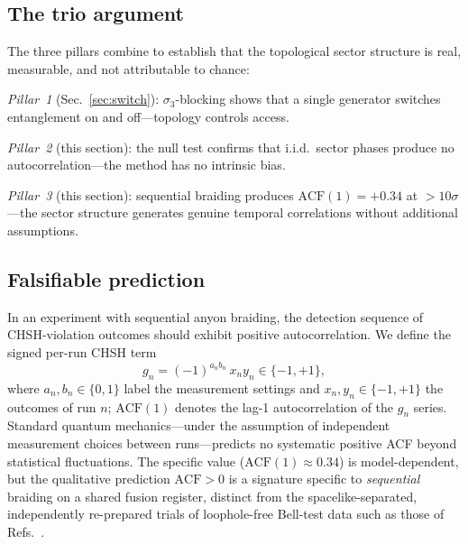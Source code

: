 \documentclass[aps,pra,twocolumn,superscriptaddress,longbibliography,floatfix,nofootinbib]{revtex4-2}
\begin{document}
\subsection{The trio argument}

The three pillars combine to establish that the topological sector
structure is real, measurable, and not attributable to chance:

\emph{Pillar~1} (Sec.~\ref{sec:switch}): $\sigma_3$-blocking shows
that a single generator switches entanglement on and off---topology
controls access.

\emph{Pillar~2} (this section): the null test confirms that
i.i.d.\ sector phases produce no autocorrelation---the method has
no intrinsic bias.

\emph{Pillar~3} (this section): sequential braiding produces
$\text{ACF}(1)=+0.34$ at $>10\sigma$---the sector structure
generates genuine temporal correlations without additional
assumptions.

\subsection{Falsifiable prediction}

In an experiment with sequential anyon braiding, the detection
sequence of CHSH-violation outcomes should exhibit positive
autocorrelation. We define the signed per-run CHSH term
\begin{equation}
g_n = (-1)^{a_n b_n}\, x_n y_n \in \{-1,+1\},
\end{equation}
where $a_n,b_n\in\{0,1\}$ label the measurement settings and
$x_n,y_n\in\{-1,+1\}$ the outcomes of run $n$; $\text{ACF}(1)$ denotes
the lag-1 autocorrelation of the $g_n$ series.
Standard quantum mechanics---under the assumption of independent
measurement choices between runs---predicts no systematic positive
ACF beyond statistical fluctuations.
The specific value ($\text{ACF}(1)\approx 0.34$) is
model-dependent, but the qualitative prediction $\text{ACF}>0$ is a
signature specific to \emph{sequential} braiding on a shared fusion
register, distinct from the spacelike-separated, independently
re-prepared trials of loophole-free Bell-test data such as those of
Refs.~\cite{Hensen2015,Giustina2015,Shalm2015}.
\end{document}
